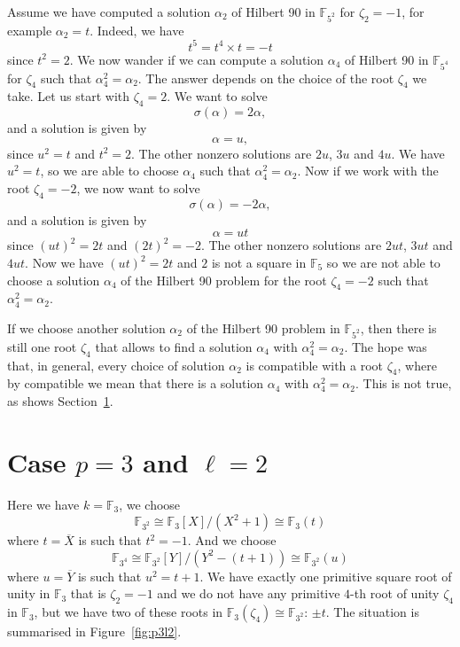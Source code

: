 \documentclass[a4paper,11pt]{article}
\begin{document}
Assume we have computed a solution $\alpha_2$ of Hilbert 90 in
$\mathbb{F}_{5^2}$ for $\zeta_2=-1$, for example $\alpha_2=t$. Indeed, we have 
\[
  t^5 = t^4\times t = -t
\]
since $t^2=2$. We now wander if we can compute a solution $\alpha_4$ of Hilbert
90 in $\mathbb{F}_{5^4}$ for $\zeta_4$ such that $\alpha_4^2=\alpha_2$. The
answer depends on the choice of the root $\zeta_4$ we take. Let us start with
$\zeta_4 = 2$. We want to solve
\[
  \sigma(\alpha) = 2\alpha,
\]
and a solution is given by 
\[
  \alpha = u,
\]
since $u^2 = t$ and $t^2 = 2$. The other nonzero solutions are $2u$, $3u$ and
$4u$. We have $u^2 = t$, so we are able to choose $\alpha_4$ such that
$\alpha_4^2 = \alpha_2$. Now if we work with the root $\zeta_4=-2$, we now want
to solve
\[
  \sigma(\alpha) = -2\alpha,
\]
and a solution is given by
\[
  \alpha = ut
\]
since $(ut)^2 = 2t$ and $(2t)^2 = -2$. The other nonzero solutions are $2ut$, $3ut$ and
$4ut$. Now we have $(ut)^2 = 2t$ and $2$ is not a square in $\mathbb{F}_5$ so we
are not able to choose a solution $\alpha_4$ of the Hilbert 90 problem for the
root $\zeta_4=-2$ such that $\alpha_4^2=\alpha_2$.

If we choose another solution $\alpha_2$ of the Hilbert 90 problem in
$\mathbb{F}_{5^2}$, then there is still one root $\zeta_4$ that allows to find a
solution $\alpha_4$ with $\alpha_4^2=\alpha_2$. The hope was that, in general,
every choice of solution $\alpha_2$ is compatible with a root $\zeta_4$, where by
compatible we mean that there is a solution $\alpha_4$ with
$\alpha_4^2=\alpha_2$. This is not true, as shows Section~\ref{sec:p3l2}.

\section{Case $p=3$ and $\ell=2$}
\label{sec:p3l2}

Here we have $k=\mathbb{F}_3$,
we choose
\[
  \mathbb{F}_{3^2}\cong\mathbb{F}_3[X]/(X^2+1)\cong\mathbb{F}_3(t)
\]
where
$t=\overline X$ is such that $t^2=-1$. And we choose 
\[
  \mathbb{F}_{3^4}\cong
\mathbb{F}_{3^2}[Y]/(Y^2-(t+1))\cong \mathbb{F}_{3^2}(u)
\]
where $u=\overline
Y$ is such that $u^2 = t+1$. We have exactly one primitive square root of
unity in $\mathbb{F}_3$ that is $\zeta_2 = -1$ and we do not have any primitive $4$-th
root of unity $\zeta_4$ in $\mathbb{F}_3$, but we have two of these roots in
$\mathbb{F}_3(\zeta_4)\cong \mathbb{F}_{3^2}$: $\pm t$. The situation is
summarised in Figure~\ref{fig:p3l2}.
\end{document}
